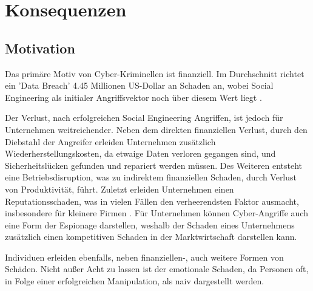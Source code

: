 \chapter{Konsequenzen}
\label{chapter:konsequenzen}

\section{Motivation}

Das primäre Motiv von Cyber-Kriminellen ist finanziell. Im Durchschnitt richtet ein 'Data Breach'
4.45 Millionen US-Dollar an Schaden an, wobei Social Engineering als initialer Angriffsvektor noch
über diesem Wert liegt .


Der Verlust, nach erfolgreichen Social Engineering Angriffen, ist jedoch für Unternehmen weitreichender.
Neben dem direkten finanziellen Verlust, durch den Diebstahl der Angreifer erleiden Unternehmen zusätzlich
Wiederherstellungskosten, da etwaige Daten verloren gegangen sind, und Sicherheitslücken gefunden und repariert
werden müssen. Des Weiteren entsteht eine Betriebsdisruption, was zu indirektem finanziellen Schaden, durch
Verlust von Produktivität, führt. Zuletzt erleiden Unternehmen einen Reputationsschaden, was in vielen Fällen
den verheerendsten Faktor ausmacht, insbesondere für kleinere Firmen .
Für Unternehmen können Cyber-Angriffe auch eine Form der Espionage darstellen, weshalb der Schaden eines
Unternehmens zusätzlich einen kompetitiven Schaden in der Marktwirtschaft darstellen kann.

Individuen erleiden ebenfalls, neben finanziellen-, auch weitere Formen von Schäden.
Nicht außer Acht zu lassen ist der emotionale Schaden, da Personen oft, in Folge einer erfolgreichen
Manipulation, als naiv dargestellt werden.









